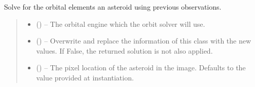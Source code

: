 \documentclass[letterpaper,11pt,english]{sphinxmanual}
\begin{document}
\begin{savenotes}
\begin{fulllineitems}
\begin{savenotes}\begin{fulllineitems}
\label{\detokenize{code/opihiexarata.opihi.solution:opihiexarata.opihi.solution.OpihiSolution.solve_orbit}}
\pysigstartsignatures
{}
\pysigstopsignatures
\sphinxAtStartPar
Solve for the orbital elements an asteroid using previous
observations.
\begin{quote}\begin{description}
\begin{itemize}
\item {} 
\sphinxAtStartPar
{} ({\hyperref[\detokenize{code/opihiexarata.library.engine:opihiexarata.library.engine.OrbitEngine}]{}}) – The orbital engine which the orbit solver will use.

\item {} 
\sphinxAtStartPar
{} (\sphinxstyleliteralemphasis{\sphinxupquote{, }}) – Overwrite and replace the information of this class with the new
values. If False, the returned solution is not also applied.

\item {} 
\sphinxAtStartPar
{} (\sphinxstyleliteralemphasis{\sphinxupquote{, }}) – The pixel location of the asteroid in the image. Defaults to the
value provided at instantiation.


\end{itemize}
\end{description}
\end{quote}
\end{fulllineitems}
\end{savenotes}
\end{fulllineitems}
\end{savenotes}
\end{document}
